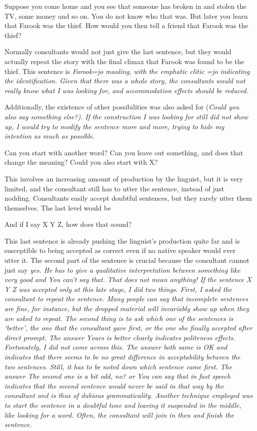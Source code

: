 \ea Suppose you come home and you see that someone has broken in and stolen the TV, some money and so on. You do not know who that was. But later you learn that Farook was the thief. How would you then tell a friend that Farook was the thief? \z

Normally consultants would not just give the last sentence, but they would actually repeat the story with the final climax that Farook was found to be the thief. This sentence is \em Farook=jo maaling\em, with the emphatic clitic \em =jo \em indicating the identification. Given that there was a whole story, the consultants would not really know what I was looking for, and accommodation effects should be reduced.

Additionally, the existence of other possibilities was also asked for (\em Could you also say something else?\em). If the construction I was looking for still did not show up, I would try to modify the sentence more and more, trying to hide my intention as much as possible.

\ea \ea Can you start with another word?  
\ex Can you leave out something, and does that change the meaning?  
\ex Could you also start with X?\z\z

This involves an increasing amount of production by the linguist, but it is very limited, and the consultant still has to utter the sentence, instead of just nodding. Consultants easily accept doubtful sentences, but they rarely utter them themselves. The last level would be 

\ea And if I say X Y Z, how does that sound?\z

This last sentence is already pushing the linguist's production quite far and is susceptible to being accepted as correct even if no native speaker would ever utter it.
The second part of the sentence is crucial because the consultant cannot just say \em yes\em. He has to give a qualitative interpretation between something like \em very good \em and \em You can't say that. That does not mean anything! \em If the sentence X Y Z was accepted only at this late stage, I did two things. First, I asked the consultant to repeat the sentence. Many people can say that incomplete sentences are fine, for instance, but the dropped material will invariably show up when they are asked to repeat. The second thing is to ask which one of the sentences is `better', the one that the consultant gave first, or the one she finally accepted after direct prompt. The answer \em Yours is better \em clearly indicates politeness effects. Fortunately, I did not come across this. The answer \em both same \em is OK and indicates that there seems to be no great difference in acceptability between the two sentences. Still, it has to be noted down which sentence came first. The answer \em The second one is a bit odd, no? \em or \em You can say that in fast speech \em indicates that the second sentence would never be said in that way by the consultant and is thus of dubious grammaticality.
Another technique  employed was to start the sentence in a doubtful tone and leaving it suspended in the middle, like looking for a word. Often, the consultant will join in then and finish the sentence.

